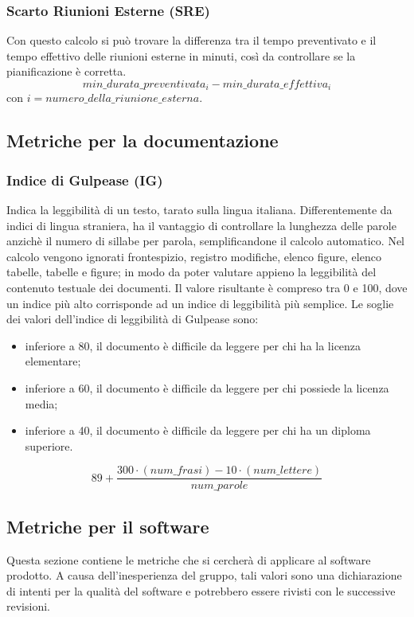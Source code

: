 \subsubsection{Scarto Riunioni Esterne (SRE)}
Con questo calcolo si può trovare la differenza tra il tempo preventivato e il tempo effettivo delle riunioni esterne in minuti, così da controllare se la pianificazione è corretta.
\[min\_durata\_preventivata_i-min\_durata\_effettiva_i\]
con $i = {numero\_della\_riunione\_esterna}$.
\subsection{Metriche per la documentazione}

\subsubsection{Indice di Gulpease (IG)}
Indica la leggibilità di un testo, tarato sulla lingua italiana. Differentemente da indici di lingua straniera, ha il vantaggio di controllare la lunghezza delle parole anzichè il numero di sillabe per parola, semplificandone il calcolo automatico. 
Nel calcolo vengono ignorati frontespizio, registro modifiche, elenco figure, elenco tabelle, tabelle e figure; in modo da poter valutare appieno la leggibilità del contenuto testuale dei documenti.
Il valore risultante è compreso tra 0 e 100, dove un indice più alto corrisponde ad un indice di leggibilità più semplice.
Le soglie dei valori dell’indice di leggibilità di Gulpease sono:
\begin{itemize}
    \item inferiore a 80, il documento è difficile da leggere per chi ha la licenza elementare;
    \item inferiore a 60, il documento è difficile da leggere per chi possiede la licenza media;
    \item inferiore a 40, il documento è difficile da leggere per chi ha un diploma superiore.
\end{itemize}
\[
    89+ \frac{300\cdot (num\_frasi) - 10\cdot (num\_lettere)}{num\_parole}
\]

\subsection{Metriche per il software}
Questa sezione contiene le metriche che si cercherà di applicare al software prodotto. A causa dell’inesperienza del gruppo, tali valori sono una dichiarazione di intenti per la qualità del software e potrebbero essere rivisti con le successive revisioni.

